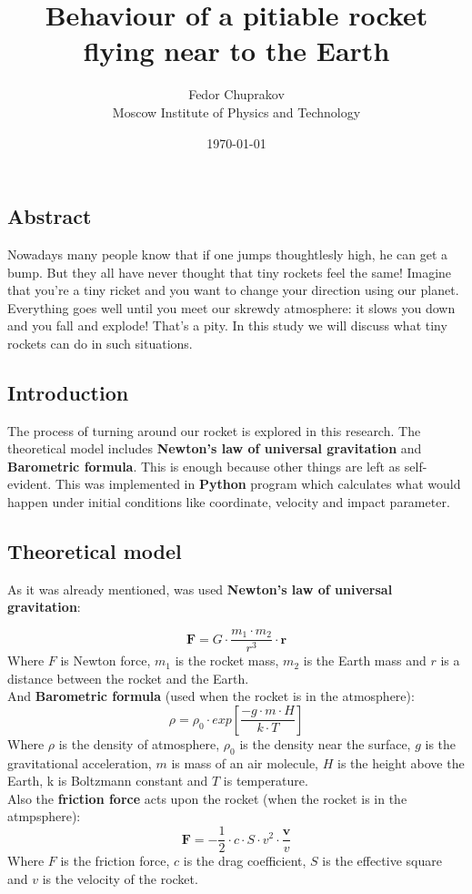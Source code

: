 \documentclass[a4paper,12pt]{article}
\author{Fedor Chuprakov\\ Moscow Institute of Physics and Technology}
\title{Behaviour of a pitiable rocket flying near to the Earth}
\date{\today}
\begin{document}
\maketitle
\newpage
\subsection*{Abstract}
Nowadays many people know that if one jumps thoughtlesly high, he can get a 
bump. But they all have never thought that tiny rockets feel the same! Imagine 
that you're a tiny ricket and you want to change your direction using our 
planet. Everything goes well until you meet our skrewdy atmosphere: 
it slows you down and you fall and explode! That's a pity. In 
this study we will discuss what tiny rockets can do in such situations.
\subsection*{Introduction}
The process of turning around our rocket is explored in this research.
The theoretical model includes \textbf{Newton's law of universal gravitation
} and \textbf{Barometric formula}. This is enough because other things are left
as self-evident. This was implemented in \textbf{Python} program which 
calculates what would happen under initial conditions like coordinate, 
velocity and impact parameter.
\subsection*{Theoretical model}
As it was already mentioned, was used \textbf{Newton's law of universal gravitation}:

\begin{equation}\label{Newton}
	\textbf{F}=G\cdot \frac{m_1\cdot m_2}{r^3} \cdot \textbf{r}
\end{equation}
Where \textit{$F$} is Newton force, \textit{$m_1$} is the rocket mass,
\textit{$m_2$} is the Earth mass and \textit{$r$} is a distance 
between the rocket and the Earth.\\
And \textbf{Barometric formula} (used when the rocket is in the atmosphere):
\begin{equation}\label{Barometric}
	\rho = \rho_0 \cdot exp \left[ \frac{-g \cdot m \cdot H}{k \cdot T} \right]
\end{equation}
Where \textit{$\rho$} is the density of atmosphere, \textit{$\rho_0$} is the 
density near the surface, \textit{$g$} is the gravitational acceleration, 
\textit{$m$} is mass of an air molecule, \textit{$H$} is the height above
the Earth, k is Boltzmann constant and \textit{$T$} is temperature.\\
Also the \textbf{friction force} acts upon the rocket 
(when the rocket is in the atmpsphere):
\begin{equation}\label{Resistance}
	\textbf{F} = -\frac{1}{2} \cdot c \cdot S \cdot v^2 \cdot \frac{\textbf{v}}{v}
\end{equation}
Where \textit{$F$} is the friction force, \textit{$c$} is the drag coefficient,
\textit{$S$} is the effective square and 
\textit{$v$} is the velocity of the rocket.
\end{document}
